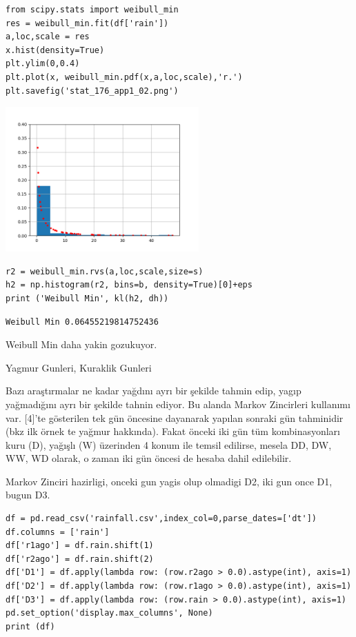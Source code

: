 \documentclass[12pt,fleqn]{article}\usepackage{../../common}
\begin{document}
\begin{verbatim}
from scipy.stats import weibull_min
res = weibull_min.fit(df['rain'])
a,loc,scale = res  
x.hist(density=True)
plt.ylim(0,0.4)
plt.plot(x, weibull_min.pdf(x,a,loc,scale),'r.')
plt.savefig('stat_176_app1_02.png')
\end{verbatim}

\includegraphics[width=20em]{stat_176_app1_02.png}

\begin{verbatim}
r2 = weibull_min.rvs(a,loc,scale,size=s)
h2 = np.histogram(r2, bins=b, density=True)[0]+eps
print ('Weibull Min', kl(h2, dh))
\end{verbatim}

\begin{verbatim}
Weibull Min 0.06455219814752436
\end{verbatim}

Weibull Min daha yakin gozukuyor.

Yagmur Gunleri, Kuraklik Gunleri

Bazı araştırmalar ne kadar yağdını ayrı bir şekilde tahmin edip, yagıp
yağmadığını ayrı bir şekilde tahnin ediyor. Bu alanda Markov Zincirleri
kullanımı var. [4]'te gösterilen tek gün öncesine dayanarak yapılan
sonraki gün tahminidir (bkz ilk örnek te yağmur hakkında). Fakat önceki
iki gün tüm kombinasyonları kuru (D), yağışlı (W) üzerinden 4 konum ile
temsil edilirse, mesela DD, DW, WW, WD olarak, o zaman iki gün öncesi de
hesaba dahil edilebilir.

Markov Zinciri hazirligi, onceki gun yagis olup olmadigi D2, iki gun once D1,
bugun D3.

\begin{verbatim}
df = pd.read_csv('rainfall.csv',index_col=0,parse_dates=['dt'])
df.columns = ['rain']
df['r1ago'] = df.rain.shift(1)
df['r2ago'] = df.rain.shift(2)
df['D1'] = df.apply(lambda row: (row.r2ago > 0.0).astype(int), axis=1)
df['D2'] = df.apply(lambda row: (row.r1ago > 0.0).astype(int), axis=1)
df['D3'] = df.apply(lambda row: (row.rain > 0.0).astype(int), axis=1)
pd.set_option('display.max_columns', None)
print (df)
\end{verbatim}
\end{document}
